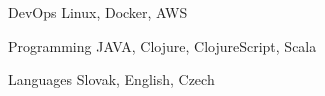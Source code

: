 

\begin{cvskills}

  \cvskill
    {DevOps} %
    {Linux, Docker, AWS} %

  \cvskill
    {Programming} %
    {JAVA, Clojure, ClojureScript, Scala} %

  \cvskill
    {Languages} %
    {Slovak, English, Czech} %

\end{cvskills}
